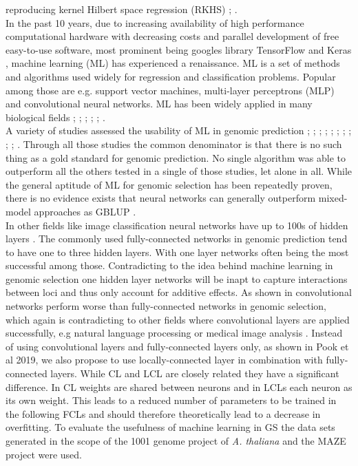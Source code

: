 reproducing kernel Hilbert space regression (RKHS) \cite{jiang2015}; \cite{martini2017genomic}. \\
In the past 10 years, due to increasing availability of high performance computational
hardware with decreasing costs and parallel development of free easy-to-use software, most
prominent being googles library TensorFlow \cite{TF2016} and Keras \cite{keras2015},
machine learning (ML) has experienced a renaissance. ML is a set of methods and algorithms
used widely for regression and classification problems. Popular among those are
e.g. support vector machines, multi-layer perceptrons (MLP) and convolutional neural
networks. ML has been widely applied in many biological fields \cite{min2017deep};
\cite{lan2018survey}; \cite{mamoshina2016applications}; \cite{angermueller2016};
\cite{webb2018deep}; \cite{rampasek2016tensorflow}. \\
A variety of studies assessed the usability of ML in genomic prediction
\cite{gonzalez2018applications}; \cite{gonza2016}; \cite{ogutu2011comparison};
\cite{montesinos2019benchmarking}; \cite{grinberg2018evaluation}; \cite{cuevas2019deep};
\cite{montesinos2019new}; \cite{ma2017deepgs}; \cite{qiu2016application};
\cite{gonza2012}; \cite{li2018genomic}. Through all those studies the common denominator
is that there is no such thing as a gold standard for genomic prediction. No single
algorithm was able to outperform all the others tested in a single of those studies, let
alone in all. While the general aptitude of ML for genomic selection has been repeatedly
proven, there is no evidence exists that neural networks can generally outperform
mixed-model approaches as GBLUP \cite{hayes2001}. \\
In other fields like image classification neural networks have up to 100s of hidden layers
\cite{he2016deep}. The commonly used fully-connected networks in genomic prediction tend
to have one to three hidden layers. With one layer networks often being the most
successful among those. Contradicting to the idea behind machine learning in genomic
selection one hidden layer networks will be inapt to capture interactions between loci and
thus only account for additive effects. As shown in \cite{azodi2019} convolutional
networks perform worse than fully-connected networks in genomic selection, which again is
contradicting to other fields where convolutional layers are applied successfully, e.g
natural language processing \cite{dos2014deep} or medical image analysis
\cite{litjens2017survey}. Instead of using convolutional layers and fully-connected layers
only, as shown in Pook et al 2019, we also propose to use locally-connected layer in
combination with fully-connected layers. While CL and LCL are closely related they have a
significant difference. In CL weights are shared between neurons and in LCLs each neuron
as its own weight. This leads to a reduced number of parameters to be trained in the
following FCLs and should therefore theoretically lead to a decrease in overfitting. To
evaluate the usefulness of machine learning in GS the data sets generated in the scope of
the 1001 genome project of \textit{A. thaliana} \cite{1001genome} and the MAZE project
were used.

